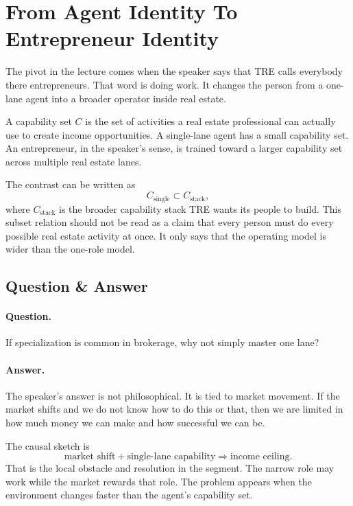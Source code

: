 \section{From Agent Identity To Entrepreneur Identity}

The pivot in the lecture comes when the speaker says that TRE calls everybody there entrepreneurs. That word is doing work. It changes the person from a one-lane agent into a broader operator inside real estate.

\begin{definition}
A capability set \(C\) is the set of activities a real estate professional can actually use to create income opportunities. A single-lane agent has a small capability set. An entrepreneur, in the speaker's sense, is trained toward a larger capability set across multiple real estate lanes.
\end{definition}

The contrast can be written as
\begin{equation}
C_{\text{single}}
\subset
C_{\text{stack}},
\end{equation}
where \(C_{\text{stack}}\) is the broader capability stack TRE wants its people to build. This subset relation should not be read as a claim that every person must do every possible real estate activity at once. It only says that the operating model is wider than the one-role model.

\subsection{Question \& Answer}

\paragraph{Question.} If specialization is common in brokerage, why not simply master one lane?

\paragraph{Answer.} The speaker's answer is not philosophical. It is tied to market movement. If the market shifts and we do not know how to do this or that, then we are limited in how much money we can make and how successful we can be.

The causal sketch is
\begin{equation}
\text{market shift}
+
\text{single-lane capability}
\Longrightarrow
\text{income ceiling}.
\end{equation}
That is the local obstacle and resolution in the segment. The narrow role may work while the market rewards that role. The problem appears when the environment changes faster than the agent's capability set.

